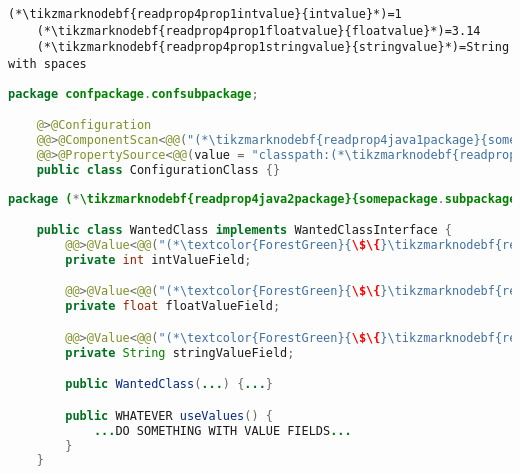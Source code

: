 \enlargethispage{20mm}
\thispagestyle{empty}
\begin{lstlisting}[title={A \mboxtextit{.properties} file called \tikzmarknodebf{readprop4prop1filename}{\textit{annotations.properties}}}]
    (*\tikzmarknodebf{readprop4prop1intvalue}{intvalue}*)=1
    (*\tikzmarknodebf{readprop4prop1floatvalue}{floatvalue}*)=3.14
    (*\tikzmarknodebf{readprop4prop1stringvalue}{stringvalue}*)=String with spaces
\end{lstlisting}
\begin{lstlisting}[language=Java, title={Configuration class}]
    package confpackage.confsubpackage;

    @>@Configuration
    @@>@ComponentScan<@@("(*\tikzmarknodebf{readprop4java1package}{somepackage.subpackage}[ForestGreen]*)")
    @@>@PropertySource<@@(value = "classpath:(*\tikzmarknodebf{readprop4java1filename}{annotations.properties}[ForestGreen]*)", encoding = "utf-8")
    public class ConfigurationClass {}
\end{lstlisting}
\begin{lstlisting}[language=Java, title={Wanted class with any constructor}]
    package (*\tikzmarknodebf{readprop4java2package}{somepackage.subpackage}*)

    public class WantedClass implements WantedClassInterface {
        @@>@Value<@@("(*\textcolor{ForestGreen}{\$\{}\tikzmarknodebf{readprop4java2intvalue}{intvalue}[ForestGreen]\textcolor{ForestGreen}{\}}*)")
        private int intValueField;

        @@>@Value<@@("(*\textcolor{ForestGreen}{\$\{}\tikzmarknodebf{readprop4java2floatvalue}{floatvalue}[ForestGreen]\textcolor{ForestGreen}{\}}*)")
        private float floatValueField;

        @@>@Value<@@("(*\textcolor{ForestGreen}{\$\{}\tikzmarknodebf{readprop4java2stringvalue}{stringvalue}[ForestGreen]\textcolor{ForestGreen}{\}}*)")
        private String stringValueField;

        public WantedClass(...) {...}

        public WHATEVER useValues() {
            ...DO SOMETHING WITH VALUE FIELDS...
        }
    }
\end{lstlisting}
\newpage

